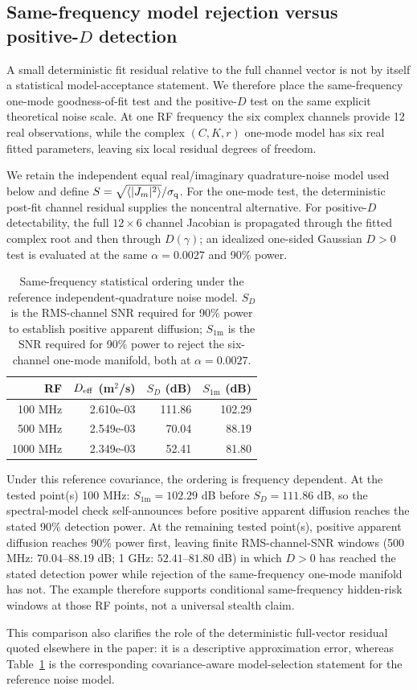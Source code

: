 \subsection{Same-frequency model rejection versus positive-$D$ detection}

A small deterministic fit residual relative to the full channel vector is not by itself a statistical model-acceptance statement. We therefore place the same-frequency one-mode goodness-of-fit test and the positive-$D$ test on the same explicit theoretical noise scale. At one RF frequency the six complex channels provide 12 real observations, while the complex $(C,K,r)$ one-mode model has six real fitted parameters, leaving six local residual degrees of freedom.

We retain the independent equal real/imaginary quadrature-noise model used below and define $S=\sqrt{\langle |J_m|^2\rangle}/\sigma_{\rm q}$. For the one-mode test, the deterministic post-fit channel residual supplies the noncentral alternative. For positive-$D$ detectability, the full $12\times6$ channel Jacobian is propagated through the fitted complex root and then through $D(\gamma)$; an idealized one-sided Gaussian $D>0$ test is evaluated at the same $\alpha=0.0027$ and 90\% power.

\begin{table}[t]
\caption{Same-frequency statistical ordering under the reference independent-quadrature noise model. $S_D$ is the RMS-channel SNR required for 90\% power to establish positive apparent diffusion; $S_{1\mathrm{m}}$ is the SNR required for 90\% power to reject the six-channel one-mode manifold, both at $\alpha=0.0027$.}
\label{tab:samefreq}
\centering
\begin{tabular}{rrrr}
\toprule
RF & $D_{\rm eff}$ (m$^2$/s) & $S_D$ (dB) & $S_{1\mathrm{m}}$ (dB)\\
\midrule
100 MHz & 2.610e-03 & 111.86 & 102.29\\
500 MHz & 2.549e-03 & 70.04 & 88.19\\
1000 MHz & 2.349e-03 & 52.41 & 81.80\\
\bottomrule
\end{tabular}
\end{table}

Under this reference covariance, the ordering is frequency dependent.  At the tested point(s) 100 MHz: $S_{1\mathrm{m}}=102.29$ dB before $S_D=111.86$ dB, so the spectral-model check self-announces before positive apparent diffusion reaches the stated 90\% detection power.  At the remaining tested point(s), positive apparent diffusion reaches 90\% power first, leaving finite RMS-channel-SNR windows (500 MHz: $70.04$--$88.19$ dB; 1 GHz: $52.41$--$81.80$ dB) in which $D>0$ has reached the stated detection power while rejection of the same-frequency one-mode manifold has not.  The example therefore supports conditional same-frequency hidden-risk windows at those RF points, not a universal stealth claim.

This comparison also clarifies the role of the deterministic full-vector residual quoted elsewhere in the paper: it is a descriptive approximation error, whereas Table~\ref{tab:samefreq} is the corresponding covariance-aware model-selection statement for the reference noise model.
